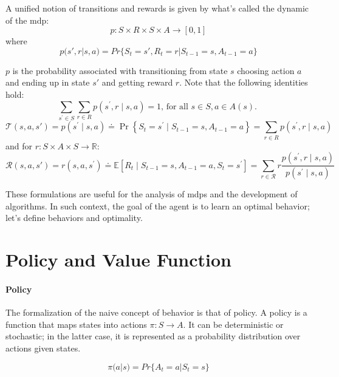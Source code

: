 A unified notion of transitions and rewards is given by what's called the dynamic of the \gls{mdp}:
$$p : S \times R \times S \times A \rightarrow [0, 1]$$
where
$$p(s' , r |s, a) = Pr\{S_t = s' , R_t = r | S_{t-1} = s, A_{t-1}= a\}$$

$p$ is the probability associated with transitioning from state $s$ choosing action $a$ 
and ending up in state $s'$ and getting reward $r$. Note that the following identities hold:
$$\sum_{s^{\prime} \in S} \sum_{r \in R} p\left(s^{\prime}, r \mid s, a\right)=1 \text {, for all } s \in S, a \in A(s) \text {. }  $$
$$
\mathcal{T}(s,a,s') = p\left(s^{\prime} \mid s, a\right) \doteq \operatorname{Pr}\left\{S_{t}=s^{\prime} \mid S_{t-1}=s, A_{t-1}=a\right\}=\sum_{r \in R} p\left(s^{\prime}, r \mid s, a\right)
$$
and for \(r: S \times A \times S \rightarrow \mathbb{R}\):
$$
\mathcal{R}(s,a,s') = r\left(s, a, s^{\prime}\right) \doteq \mathbb{E}\left[R_{t} \mid S_{t-1}=s, A_{t-1}=a, S_{t}=s^{\prime}\right]=\sum_{r \in \mathcal{R}} r \frac{p\left(s^{\prime}, r \mid s, a\right)}{p\left(s^{\prime} \mid s, a\right)}
$$

These formulations are useful for the analysis of \glspl{mdp} and the development of algorithms. 
In such context, the goal of the agent is to learn an optimal behavior; let's define behaviors and optimality.

\section{Policy and Value Function}
\paragraph{Policy}
The formalization of the naive concept of behavior is that of policy. A policy is a function that 
maps states into actions $\pi : S \rightarrow A$. It can be deterministic or stochastic; in 
the latter case, it is represented as a probability distribution over actions given states.

$$\pi(a|s) = Pr\{A_t = a | S_t = s\}$$

